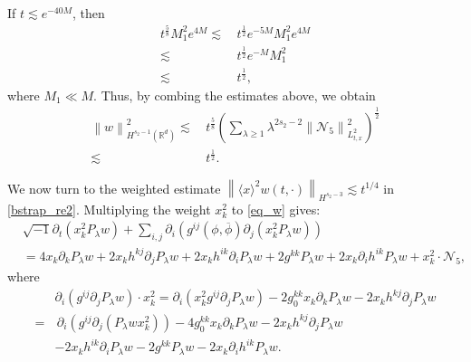 \documentclass[10pt,twoside,a4paper]{article}
\numberwithin{equation}{section}\allowdisplaybreaks
\def\geq{\geqslant}
\begin{document}
	If $ t\lesssim     e^{-40M }$, then 
	\begin{align*}
		t^{\frac 58} M_1^2    e^{4M } \lesssim&\, t^{\frac12} e^{- 5M }  M_1^2    e^{4M }  \\
		\lesssim &\,  t^{\frac12} e^{- M }  M_1^{2}   \\
		\lesssim &\,  t^{\frac 12},
	\end{align*}
	where $ M_1\ll M. $
	Thus, by combing the estimates above, we obtain
	\begin{align*}
		\left\| w\right\|^2_{H^{s_2-1}(\mathbb{R}^d)} \lesssim& \,t^{\frac 58}
		\left(\sum_{\lambda \geq 1} \lambda^{ 2s_2-2}\left\|\mathcal{N}_5\right\|_{L^2_{t,x}}^2\right)^{\frac12 }\\
		\lesssim & \,t^{\frac 12}.
	\end{align*}
	
	
	We now turn to the weighted estimate $\left\| \langle x \rangle^2 w(t,\cdot) \right\|_{H^{s_2-3}} \lesssim t^{1/4}$ in \eqref{bstrap_re2}. Multiplying the weight $x_k^2$ to \eqref{eq_w} gives:
	\begin{align}   \label{w_x2}
		&	\sqrt{-1} \partial_t   ( x_k^2 P_{\lambda }  w )+\sum_{i,j}\partial_i\left( g^{ij}(\phi,\overline{\phi })   \partial_j \left(x_k^2  P_{\lambda }  w\right)\right)\\
		&=4 x_k \partial_k  P_{\lambda }  w +2 x_k h^{kj}  \partial_j P_{\lambda }  w+2 x_k h^{ik} \partial_i P_{\lambda }  w +2 g^{kk}P_{\lambda }  w +2 x_k \partial_i h^{ik}P_{\lambda }  w +x^2_k \cdot\mathcal{N}_5,\nonumber
	\end{align}
	where
	\begin{align*}
		&	\partial_i\left( g^{ij} \partial_j P_{\lambda }  w\right) \cdot x^2_k= \partial_i\left(  x^2_k g^{ij} \partial_j P_{\lambda }  w\right)  -2 g^{kk}_0x_k \partial_k  P_{\lambda }  w -2 x_k h^{kj} \partial_j P_{\lambda }  w\\ 
		=&\,\partial_i\left( g^{ij} \partial_j\left(P_{\lambda }  w x^2_k\right)\right)   -4 g^{kk}_0x_k \partial_k  P_{\lambda }  w -2 x_k h^{kj} \partial_j P_{\lambda }  w\\
		&-2 x_k h^{ik} \partial_i P_{\lambda }  w-2 g^{kk}P_{\lambda }  w -2 x_k \partial_i h^{ik}P_{\lambda }  w.
	\end{align*}
	
\end{document}
